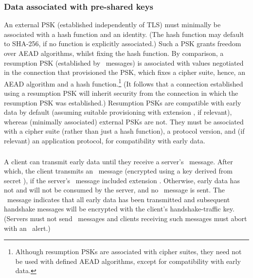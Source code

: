 \subsubsection*{Data associated with pre-shared keys}

An external PSK (established independently of TLS) must minimally be associated 
with a hash function and an identity. (The hash function may default to SHA-256, 
if no function is explicitly associated.)
Such a PSK grants freedom over AEAD algorithms, whilst 
fixing the hash function. By comparison, a resumption PSK (established by 
\NewSessionTicket\ messages) is associated with values negotiated in the 
connection that provisioned the PSK, which fixes a cipher suite, hence, 
an AEAD algorithm and a hash function.\footnote{%
  Although resumption PSKs are associated with cipher suites, they need 
  not be used with defined AEAD algorithms, except for compatibility 
  with early data.}
(It follows that a connection established using a resumption PSK will 
inherit security from the connection in which the resumption PSK was 
established.)
Resumption PSKs are compatible with 
early data by default (assuming suitable provisioning with extension 
\TLSapplicationLayerProtocolNegotiation, if relevant), whereas (minimally 
associated) external PSKs are not. They must be associated with a cipher suite 
(rather than just a hash function), a protocol version, and (if relevant)  an 
application protocol, for compatibility with early data.


\subsubsection{\EndOfEarlyData}

A client can transmit early data until they receive a server's \Finished\
message. After which, the client transmits an \EndOfEarlyData\ message
(encrypted using a key derived from secret \TLSclientEarlyTrafficSecret), 
if the server's \EncryptedExtensions\ message included extension
\TLSearlyData. Otherwise, early data has not and will not be consumed 
by the server, and no \EndOfEarlyData\ message is sent. The \EndOfEarlyData\ 
message indicates that all early data has been transmitted and subsequent
handshake messages will be encrypted with the client's handshake-traffic key.
(Servers must not send \EndOfEarlyData\ messages and clients receiving 
such messages must abort with an \TLSunexpectedMessage\ alert.)




